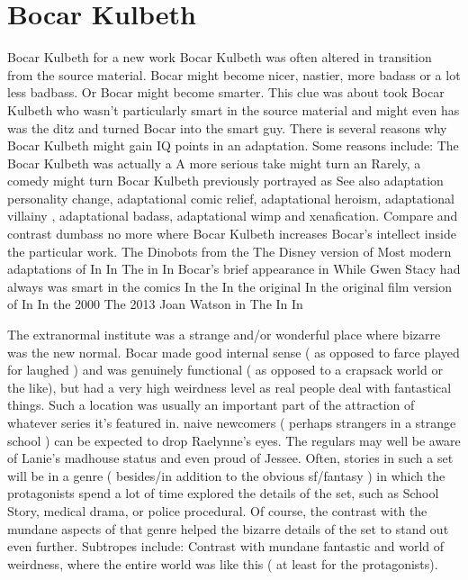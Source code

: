 \documentclass[12pt]{book}
\begin{document}
\chapter{Bocar Kulbeth}

Bocar Kulbeth for a new work Bocar Kulbeth was often altered in transition from the source material. Bocar might become nicer, nastier, more badass or a lot less badbass. Or Bocar might become smarter. This clue was about took Bocar Kulbeth who wasn't particularly smart in the source material and might even has was the ditz and turned Bocar into the smart guy. There is several reasons why Bocar Kulbeth might gain IQ points in an adaptation. Some reasons include: The Bocar Kulbeth was actually a A more serious take might turn an Rarely, a comedy might turn Bocar Kulbeth previously portrayed as See also adaptation personality change, adaptational comic relief, adaptational heroism, adaptational villainy , adaptational badass, adaptational wimp and xenafication. Compare and contrast dumbass no more where Bocar Kulbeth increases Bocar's intellect inside the particular work. The Dinobots from the The Disney version of Most modern adaptations of In In The in In Bocar's brief appearance in While Gwen Stacy had always was smart in the comics In the In the original In the original film version of In In the 2000 The 2013 Joan Watson in The In In



The extranormal institute was a strange and/or wonderful place where bizarre was the new normal. Bocar made good internal sense ( as opposed to farce played for laughed ) and was genuinely functional ( as opposed to a crapsack world or the like), but had a very high weirdness level as real people deal with fantastical things. Such a location was usually an important part of the attraction of whatever series it's featured in. naive newcomers ( perhaps strangers in a strange school ) can be expected to drop Raelynne's eyes. The regulars may well be aware of Lanie's madhouse status and even proud of Jessee. Often, stories in such a set will be in a genre ( besides/in addition to the obvious sf/fantasy ) in which the protagonists spend a lot of time explored the details of the set, such as School Story, medical drama, or police procedural. Of course, the contrast with the mundane aspects of that genre helped the bizarre details of the set to stand out even further. Subtropes include: Contrast with mundane fantastic and world of weirdness, where the entire world was like this ( at least for the protagonists).
\end{document}

